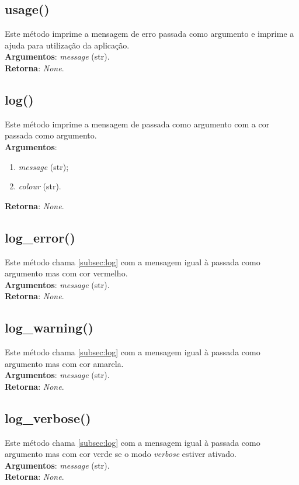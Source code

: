 \documentclass{report}
\begin{document}
\subsection{usage()}
Este método imprime a mensagem de erro passada como argumento e imprime a ajuda para utilização da aplicação.\\ 
\textbf{Argumentos}: \textit{message} (str).\\
\textbf{Retorna}: \textit{None}.

\subsection{log()}
\label{subsec:log}
Este método imprime a mensagem de passada como argumento com a cor passada como argumento.\\ 
\textbf{Argumentos}: 
\begin{enumerate}
\item \textit{message} (str);
\item \textit{colour} (str).
\end{enumerate}
\textbf{Retorna}: \textit{None}.

\subsection{log\_error()}
Este método chama \autoref{subsec:log} com a mensagem igual à passada como argumento mas com cor vermelho.\\ 
\textbf{Argumentos}:
\textit{message} (str).\\
\textbf{Retorna}: \textit{None}.

\subsection{log\_warning()}
Este método chama \autoref{subsec:log} com a mensagem igual à passada como argumento mas com cor amarela.\\ 
\textbf{Argumentos}:
\textit{message} (str).\\
\textbf{Retorna}: \textit{None}.

\subsection{log\_verbose()}
Este método chama \autoref{subsec:log} com a mensagem igual à passada como argumento mas com cor verde se o modo \textit{verbose} estiver ativado.\\ 
\textbf{Argumentos}:
\textit{message} (str).\\
\textbf{Retorna}: \textit{None}.
\end{document}
